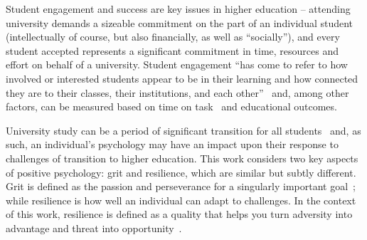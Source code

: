 \documentclass[sigconf]{acmart}
\begin{document}

Student engagement and success are key issues in higher education -- attending university demands a sizeable commitment on the part of an individual student (intellectually of course, but also financially, as well as ``socially''), and every student accepted represents a significant commitment in time, resources and effort on behalf of a university. Student engagement ``has come to refer to how involved or interested students appear to be in their learning and how connected they are to their classes, their institutions, and each other''~\citep[p.~38]{Axelson2010} and, among other factors, can be measured based on time on task~\cite{kuh2009national} and educational outcomes.

University study can be a period of significant transition for all students~\cite{Tinto1975} and, as such, an individual's psychology may have an impact upon their response to challenges of transition to higher education. This work considers two key aspects of positive psychology: grit and resilience, which are similar but subtly different. Grit is defined as the passion and perseverance for a singularly important goal~\cite{Duckworth2007}; while resilience is how well an individual can adapt to challenges. In the context of this work, resilience is defined as a quality that helps you turn adversity into advantage and threat into opportunity~\cite{Clarke2010}.  

\end{document}
